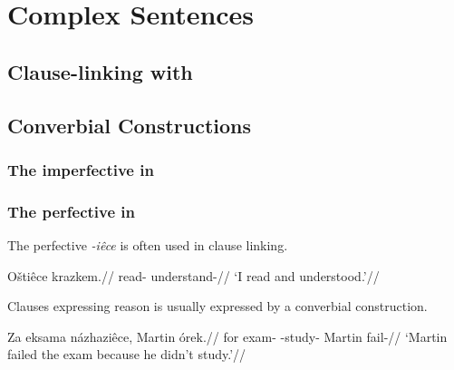 \chapter{Complex Sentences}

\section{Clause-linking with }

\section{Converbial Constructions}\label{converbs-syntax}

\subsection{The imperfective in }



\subsection{The perfective in }

The perfective \textit{-iêce} is often used in clause linking.

\pex
\begingl
\gla O\v{s}tiêce krazkem.//
\glb read- understand-//
\glft `I read and understood.'//
\endgl
\xe

Clauses expressing reason is usually expressed by a converbial construction.

\pex
\begingl
\gla Za eksama názhaziêce, Martin órek.//
\glb for exam- -study- Martin fail-//
\glft `Martin failed the exam because he didn't study.'//
\endgl
\xe